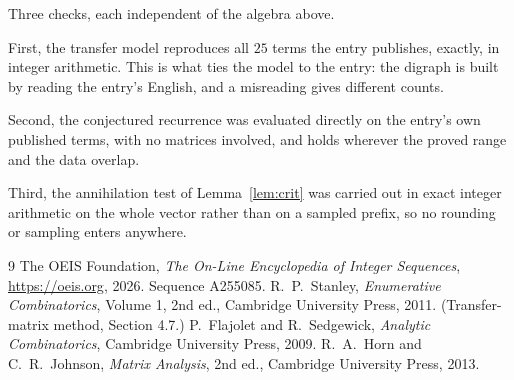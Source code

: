 \documentclass[11pt,a4paper]{article}
\theoremstyle{plain}
\theoremstyle{definition}
\begin{document}
Three checks, each independent of the algebra above.

First, the transfer model reproduces all $25$ terms the entry publishes, exactly, in
integer arithmetic. This is what ties the model to the entry: the digraph is built by reading
the entry's English, and a misreading gives different counts.

Second, the conjectured recurrence was evaluated directly on the entry's own published terms,
with no matrices involved, and holds wherever the proved range and the data overlap.

Third, the annihilation test of Lemma~\ref{lem:crit} was carried out in exact integer
arithmetic on the whole vector rather than on a sampled prefix, so no rounding or sampling
enters anywhere.

\begin{thebibliography}{9}
 The OEIS Foundation, \emph{The On-Line Encyclopedia of Integer
Sequences}, \url{https://oeis.org}, 2026. Sequence A255085.
 R.~P.~Stanley, \emph{Enumerative Combinatorics}, Volume 1, 2nd ed.,
Cambridge University Press, 2011. (Transfer-matrix method, Section 4.7.)
 P.~Flajolet and R.~Sedgewick, \emph{Analytic Combinatorics}, Cambridge
University Press, 2009.
 R.~A.~Horn and C.~R.~Johnson, \emph{Matrix Analysis}, 2nd ed., Cambridge
University Press, 2013.
\end{thebibliography}
\end{document}
